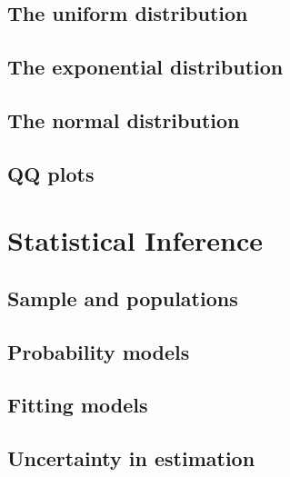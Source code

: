 \documentclass[
  11pt,
  british,
  openany, a4paper]{book}
\begin{document}
\hypertarget{the-uniform-distribution}{%
\section{The uniform distribution}\label{the-uniform-distribution}}

\hypertarget{the-exponential-distribution}{%
\section{The exponential distribution}\label{the-exponential-distribution}}

\hypertarget{normal}{%
\section{The normal distribution}\label{normal}}

\hypertarget{qq-plots}{%
\section{QQ plots}\label{qq-plots}}

\hypertarget{statistical-inference}{%
\chapter{Statistical Inference}\label{statistical-inference}}

\hypertarget{sample-and-populations}{%
\section{Sample and populations}\label{sample-and-populations}}

\hypertarget{probability-models}{%
\section{Probability models}\label{probability-models}}

\hypertarget{fitting-models}{%
\section{Fitting models}\label{fitting-models}}

\hypertarget{uncertainty-in-estimation}{%
\section{Uncertainty in estimation}\label{uncertainty-in-estimation}}
\end{document}
